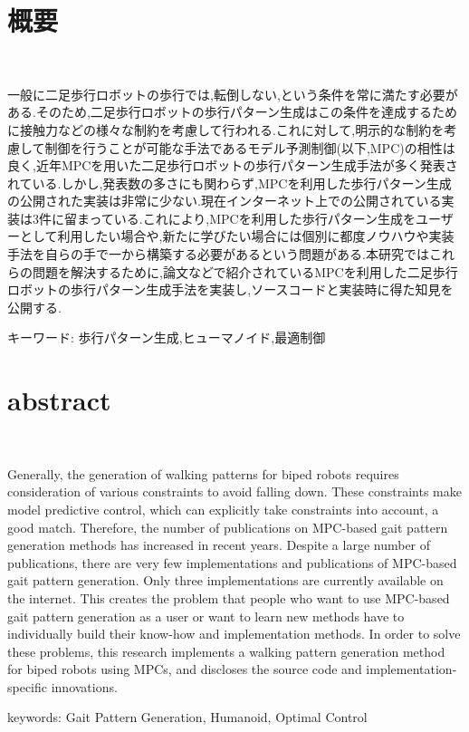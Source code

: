 \chapter*{概要}
\thispagestyle{empty}
%
\begin{center}
  \scalebox{1.5}{モデル予測制御による二足歩行ロボットの}\\
  \vspace{-0.3zh}
  \scalebox{1.5}{歩行パターン生成手法の実装と公開}
\end{center}
\vspace{1.0zh}
%
一般に二足歩行ロボットの歩行では,転倒しない,という条件を常に満たす必要がある.そのため,二足歩行ロボットの歩行パターン生成はこの条件を達成するために接触力などの様々な制約を考慮して行われる.これに対して,明示的な制約を考慮して制御を行うことが可能な手法であるモデル予測制御(以下,MPC)の相性は良く,近年MPCを用いた二足歩行ロボットの歩行パターン生成手法が多く発表されている.しかし,発表数の多さにも関わらず,MPCを利用した歩行パターン生成の公開された実装は非常に少ない.現在インターネット上での公開されている実装は3件に留まっている.これにより,MPCを利用した歩行パターン生成をユーザーとして利用したい場合や,新たに学びたい場合には個別に都度ノウハウや実装手法を自らの手で一から構築する必要があるという問題がある.本研究ではこれらの問題を解決するために,論文などで紹介されているMPCを利用した二足歩行ロボットの歩行パターン生成手法を実装し,ソースコードと実装時に得た知見を公開する.

キーワード: 歩行パターン生成,ヒューマノイド,最適制御
%
\newpage
\chapter*{abstract}
\thispagestyle{empty}
%
\begin{center}
  \scalebox{1.3}{Implementation and publication of a walking pattern generation}\\
  \vspace{-0.3zh}
  \scalebox{1.5}{for biped robots using model predictive control}
\end{center}
\vspace{1.0zh}
%


Generally, the generation of walking patterns for biped robots requires consideration of various constraints to avoid falling down. These constraints make model predictive control, which can explicitly take constraints into account, a good match. Therefore, the number of publications on MPC-based gait pattern generation methods has increased in recent years. Despite a large number of publications, there are very few implementations and publications of MPC-based gait pattern generation. Only three implementations are currently available on the internet. This creates the problem that people who want to use MPC-based gait pattern generation as a user or want to learn new methods have to individually build their know-how and implementation methods. In order to solve these problems, this research implements a walking pattern generation method for biped robots using MPCs, and discloses the source code and implementation-specific innovations.

keywords: Gait Pattern Generation, Humanoid, Optimal Control
